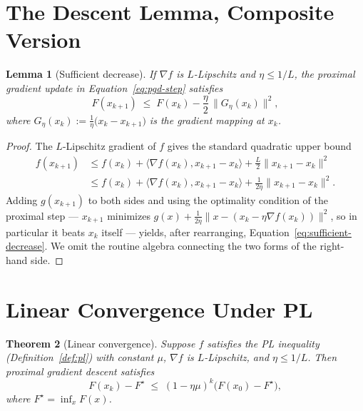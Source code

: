 \documentclass[11pt]{article}
\newtheorem{theorem}{Theorem}[section]
\newtheorem{lemma}[theorem]{Lemma}
\theoremstyle{definition}
\theoremstyle{remark}
\begin{document}
\section{The Descent Lemma, Composite Version}
\label{sec:descent}

\begin{lemma}[Sufficient decrease]
\label{lem:sufficient-decrease}
If $\nabla f$ is $L$-Lipschitz and $\eta \le 1/L$, the proximal gradient
update in Equation~\eqref{eq:pgd-step} satisfies
\begin{equation}
  \label{eq:sufficient-decrease}
  F(x_{k+1}) \;\le\; F(x_k) - \frac{\eta}{2}\, \lVert G_\eta(x_k) \rVert^2,
\end{equation}
where $G_\eta(x_k) := \frac{1}{\eta}\bigl(x_k - x_{k+1}\bigr)$ is the
gradient mapping at $x_k$.
\end{lemma}

\begin{proof}
The $L$-Lipschitz gradient of $f$ gives the standard quadratic upper
bound
\begin{align}
  f(x_{k+1}) &\le f(x_k) + \langle \nabla f(x_k), x_{k+1} - x_k \rangle + \frac{L}{2}\lVert x_{k+1} - x_k \rVert^2 \\
  &\le f(x_k) + \langle \nabla f(x_k), x_{k+1} - x_k \rangle + \frac{1}{2\eta}\lVert x_{k+1} - x_k \rVert^2.
\end{align}
Adding $g(x_{k+1})$ to both sides and using the optimality condition of
the proximal step --- $x_{k+1}$ minimizes $g(x) + \frac{1}{2\eta}\lVert x - (x_k - \eta \nabla f(x_k)) \rVert^2$,
so in particular it beats $x_k$ itself --- yields, after rearranging,
Equation~\eqref{eq:sufficient-decrease}. We omit the routine algebra
connecting the two forms of the right-hand side.
\end{proof}

\section{Linear Convergence Under PL}
\label{sec:convergence}

\begin{theorem}[Linear convergence]
\label{thm:linear-convergence}
Suppose $f$ satisfies the PL inequality (Definition~\ref{def:pl}) with
constant $\mu$, $\nabla f$ is $L$-Lipschitz, and $\eta \le 1/L$. Then
proximal gradient descent satisfies
\begin{equation}
  \label{eq:linear-rate}
  F(x_k) - F^\star \;\le\; (1 - \eta\mu)^k \bigl(F(x_0) - F^\star\bigr),
\end{equation}
where $F^\star = \inf_x F(x)$.
\end{theorem}
\end{document}
